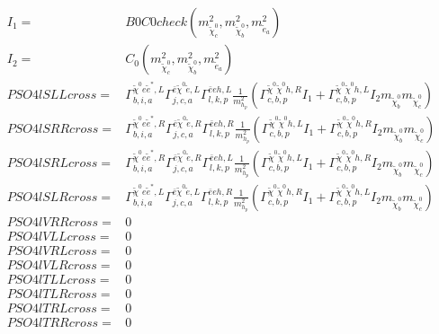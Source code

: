 \documentclass[A4,landscape]{article}
\begin{document}
\begin{align} 
I_1= & B0C0check(m^2_{\tilde{\chi}^0_{{c}}}, m^2_{\tilde{\chi}^0_{{b}}}, m^2_{\tilde{e}_{{a}}}) \\ 
I_2= & C_0(m^2_{\tilde{\chi}^0_{{c}}}, m^2_{\tilde{\chi}^0_{{b}}}, m^2_{\tilde{e}_{{a}}}) \\ 
  PSO4lSLLcross= &  \Gamma^{\tilde{\chi}^0 e \tilde{e}^*,L}_{b, i, a} \Gamma^{\bar{e}\tilde{\chi}^0 \tilde{e} ,L}_{j, c, a} \Gamma^{\bar{e}e h ,L}_{l, k, p} \frac{1}{m^2_{h_{{p}}}} (\Gamma^{\tilde{\chi}^0 \tilde{\chi}^0 h ,R}_{c, b, p} I_1 + \Gamma^{\tilde{\chi}^0 \tilde{\chi}^0 h ,L}_{c, b, p} I_2 m_{\tilde{\chi}^0_{{b}}} m_{\tilde{\chi}^0_{{c}}}) \\ 
  PSO4lSRRcross= &  \Gamma^{\tilde{\chi}^0 e \tilde{e}^*,R}_{b, i, a} \Gamma^{\bar{e}\tilde{\chi}^0 \tilde{e} ,R}_{j, c, a} \Gamma^{\bar{e}e h ,R}_{l, k, p} \frac{1}{m^2_{h_{{p}}}} (\Gamma^{\tilde{\chi}^0 \tilde{\chi}^0 h ,L}_{c, b, p} I_1 + \Gamma^{\tilde{\chi}^0 \tilde{\chi}^0 h ,R}_{c, b, p} I_2 m_{\tilde{\chi}^0_{{b}}} m_{\tilde{\chi}^0_{{c}}}) \\ 
  PSO4lSRLcross= &  \Gamma^{\tilde{\chi}^0 e \tilde{e}^*,R}_{b, i, a} \Gamma^{\bar{e}\tilde{\chi}^0 \tilde{e} ,R}_{j, c, a} \Gamma^{\bar{e}e h ,L}_{l, k, p} \frac{1}{m^2_{h_{{p}}}} (\Gamma^{\tilde{\chi}^0 \tilde{\chi}^0 h ,L}_{c, b, p} I_1 + \Gamma^{\tilde{\chi}^0 \tilde{\chi}^0 h ,R}_{c, b, p} I_2 m_{\tilde{\chi}^0_{{b}}} m_{\tilde{\chi}^0_{{c}}}) \\ 
  PSO4lSLRcross= &  \Gamma^{\tilde{\chi}^0 e \tilde{e}^*,L}_{b, i, a} \Gamma^{\bar{e}\tilde{\chi}^0 \tilde{e} ,L}_{j, c, a} \Gamma^{\bar{e}e h ,R}_{l, k, p} \frac{1}{m^2_{h_{{p}}}} (\Gamma^{\tilde{\chi}^0 \tilde{\chi}^0 h ,R}_{c, b, p} I_1 + \Gamma^{\tilde{\chi}^0 \tilde{\chi}^0 h ,L}_{c, b, p} I_2 m_{\tilde{\chi}^0_{{b}}} m_{\tilde{\chi}^0_{{c}}}) \\ 
  PSO4lVRRcross= & 0 \\ 
  PSO4lVLLcross= & 0 \\ 
  PSO4lVRLcross= & 0 \\ 
  PSO4lVLRcross= & 0 \\ 
  PSO4lTLLcross= & 0 \\ 
  PSO4lTLRcross= & 0 \\ 
  PSO4lTRLcross= & 0 \\ 
  PSO4lTRRcross= & 0 \\ 
\end{align} 
\end{document}
